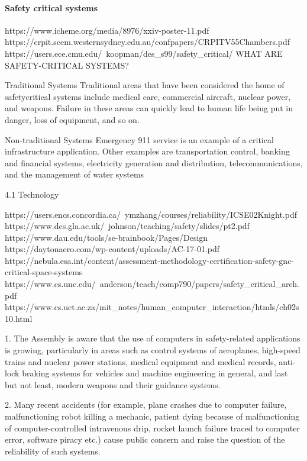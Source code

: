 \paragraph{Safety critical systems}


https://www.icheme.org/media/8976/xxiv-poster-11.pdf
https://crpit.scem.westernsydney.edu.au/confpapers/CRPITV55Chambers.pdf
https://users.ece.cmu.edu/~koopman/des_s99/safety_critical/
WHAT ARE SAFETY-CRITICAL SYSTEMS?

Traditional Systems
Traditional areas that have been considered the home of safetycritical systems include medical care, commercial aircraft, nuclear
power, and weapons. Failure in these areas can quickly lead to
human life being put in danger, loss of equipment, and so on.

Non-traditional Systems
Emergency 911 service is an example of a critical infrastructure
application. Other examples are transportation control, banking
and financial systems, electricity generation and distribution, telecommunications, and the management of water systems

4.1 Technology


https://users.encs.concordia.ca/~ymzhang/courses/reliability/ICSE02Knight.pdf
https://www.dcs.gla.ac.uk/~johnson/teaching/safety/slides/pt2.pdf
https://www.dau.edu/tools/se-brainbook/Pages/Design%
https://daytonaero.com/wp-content/uploads/AC-17-01.pdf
https://nebula.esa.int/content/assessment-methodology-certification-safety-gnc-critical-space-systems
https://www.cs.unc.edu/~anderson/teach/comp790/papers/safety_critical_arch.pdf
https://www.cs.uct.ac.za/mit_notes/human_computer_interaction/htmls/ch02s10.html

1.       The Assembly is aware that the use of computers in safety-related applications is growing, particularly in areas such as control systems of aeroplanes, high-speed trains and nuclear power stations, medical equipment and medical records, anti-lock braking systems for vehicles and machine engineering in general, and last but not least, modern weapons and their guidance systems.

2.       Many recent accidents (for example, plane crashes due to computer failure, malfunctioning robot killing a mechanic, patient dying because of malfunctioning of computer-controlled intravenous drip, rocket launch failure traced to computer error, software piracy etc.) cause public concern and raise the question of the reliability of such systems.


